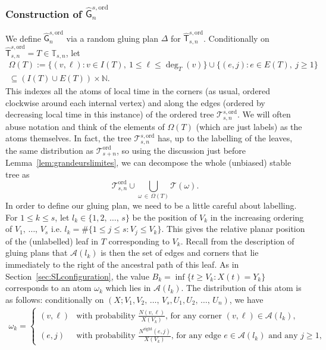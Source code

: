 \documentclass[10pt]{amsart}
\theoremstyle{definition}\newtheorem{defi}[theo]{Definition}\newtheorem{rema}[theo]{Remark}\newtheorem{exam}[theo]{Example}\newtheorem{exem}[theo]{Example}\newtheorem{nota}[theo]{Notation}
\renewcommand{\subset}{\subseteq}
\newcommand{\ord}{\mathrm{ord}}
\newcommand{\Rightll}{\mathrm{right}}
\newcommand{\cT}{\mathcal{T}}
\newcommand{\cA}{\mathcal{A}}
\newcommand{\sG}{\mathsf{G}}
\newcommand{\sT}{\mathsf{T}}
\newcommand{\A}{\mathbb{T}}
\newcommand{\N}{\mathbb{N}}
\begin{document}
\subsubsection{Construction of $\widehat{\sG}_n^{s,\ord}$}
We define $\widehat{\sG}_n^{s,\ord}$ via a random gluing plan $\Delta$ for $\widehat{\sT}_{s,n}^{s,\ord}$. Conditionally on $\widehat{\sT}^{s,\ord}_{s,n}=T\in \A_{s,n}$, let
\begin{multline*}
\Omega(T):=\big\{(v,\ell): v\in I(T),\ 1 \leq \ell \leq \deg_T(v)\big\} \cup \big\{(e,j) : e\in E(T),\ j \geq 1\big\}\\
\subset(I(T) \cup E(T)) \times\N.
\end{multline*}
This indexes all the atoms of local time in the corners (as usual, ordered clockwise around each internal vertex) and along the edges (ordered by decreasing local time in this instance) of the ordered tree $\cT_{s,n}^{s,\ord}$. We will often abuse notation and think of the elements of $\Omega(T)$ (which are just labels) as the atoms themselves. In fact, the tree $\cT_{s,n}^{s,\ord}$ has, up to the labelling of the leaves, the same distribution as $\cT_{s+n}^{\ord}$, so using the discussion just before Lemma~\ref{lem:grandeurslimites}, we can decompose the whole (unbiased) stable tree as
\[
\cT_{s,n}^{\ord}\cup \bigcup_{\omega\,\in\,\Omega(T)}\cT(\omega).
\]
In order to define our gluing plan, we need to be a little careful about labelling. For $1 \le k \le s$, let $l_k \in \{1,2,\,\ldots,\,s\}$ be the position of $V_k$ in the increasing ordering of $V_1,\,\ldots,\, V_s$ i.e. $l_k = \#\{1 \le j \le s: V_j \le V_k\}$. This gives the relative planar position of the (unlabelled) leaf in $T$ corresponding to $V_k$. Recall from the description of gluing plans that $\cA(l_k)$ is then the set of edges and corners that lie immediately to the right of the ancestral path of this leaf. As in Section~\ref{sec:SLconfiguration}, the value $B_k = \inf \{t \ge V_{k}: X(t) = Y_{k}\}$ corresponds to an atom $\omega_k$ which lies in $\cA(l_k)$. The distribution of this atom is as follows: conditionally on $(X;V_1,V_2,\,\dots,\, V_s,U_1,U_2,\,\dots,\,U_n)$, we have
\begin{align*}
\omega_k =
\begin{cases}
(v,\ell) & \text{with probability $\frac{N(v,\ell)}{X(V_k)}$, for any corner $(v,\ell) \in \cA(l_k)$},\\
(e,j) & \text{with probability $\frac{N^{\Rightll}(e,j)}{X(V_k)}$, for any edge $e \in \cA(l_k)$ and any $j \ge 1$,}
\end{cases}
\end{align*}
\end{document}
